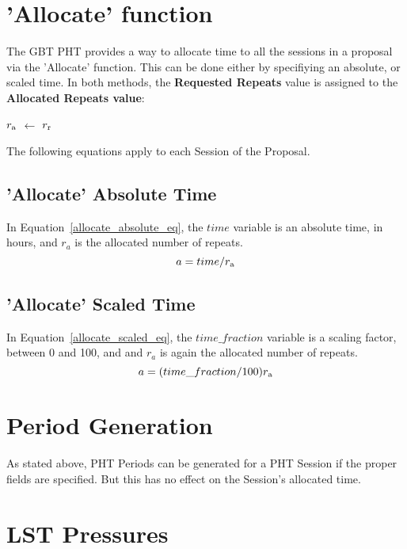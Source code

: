 \documentclass{article}
\begin{document}
\section{'Allocate' function}

The GBT PHT provides a way to allocate time to all the sessions in a proposal via the 'Allocate' function.  This can be done either by specifiying an absolute, or scaled time.  In both methods, the  {\bf Requested Repeats} value is assigned to the {\bf Allocated Repeats value}:

\begin{algorithmic}
\STATE    $r_{\rm a}$ $\leftarrow$  $r_{\rm r}$
\end{algorithmic}

The following equations apply to each Session of the Proposal.

\subsection{'Allocate' Absolute Time}
In Equation~\ref{allocate_absolute_eq}, the $time$ variable is an absolute time, in hours, and $r_a$ is the allocated number of repeats.  
\begin{equation}
\label{allocate_absolute_eq}
    a = time / r_{\rm a}
\end{equation}

\subsection{'Allocate' Scaled Time}
In Equation~\ref{allocate_scaled_eq}, the $time\_fraction$ variable is a scaling factor, between 0 and 100, and and $r_a$ is again the allocated number of repeats.  
\begin{equation}
\label{allocate_scaled_eq}
    a = (time\_fraction/100) r_{\rm a}
\end{equation}

\section{Period Generation}

   As stated above, PHT Periods can be generated for a PHT Session if the proper fields are specified.  But this has no effect on the Session's allocated time.

\section{LST Pressures}
\end{document}
